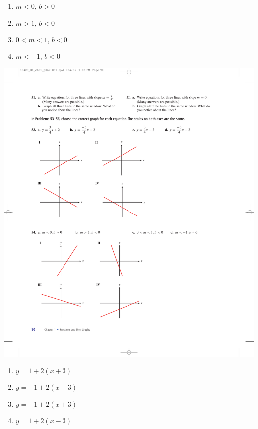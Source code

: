\documentclass[10pt,]{book}
\theoremstyle{plain}
\theoremstyle{definition}
\theoremstyle{definition}
\theoremstyle{definition}
\theoremstyle{definition}
\numberwithin{equation}{part}
\newcommand{\lt}{<}
\newcommand{\gt}{>}
\begin{document}
\begin{exerciselist}
\begin{exercisegroup}
\begin{multicols}{2}
\begin{enumerate}[label=*\alph**]
\item\hypertarget{li-1261}{}\(m\lt 0\), \(b\gt 0\)%
\item\hypertarget{li-1262}{}\(m\gt 1\), \(b\lt 0\)%
\item\hypertarget{li-1263}{}\(0\lt m\lt 1\), \(b\lt 0\)%
\item\hypertarget{li-1264}{}\(m\lt -1\), \(b\lt 0 \)%
\end{enumerate}
\end{multicols}
 \includegraphics[width=0.9\linewidth]{images/fig-ex-1-5-54}
%
\exercise[55.]\hypertarget{exercise-341}{}\leavevmode%
\begin{multicols}{2}
\begin{enumerate}[label=*\alph**]
\item\hypertarget{li-1265}{}\(y = 1 + 2(x+3) \)%
\item\hypertarget{li-1266}{}\(y = -1 + 2(x-3)\)%
\item\hypertarget{li-1267}{}\(y = -1 + 2(x+3) \)%
\item\hypertarget{li-1268}{}\(y = 1 + 2(x-3) \)%
\end{enumerate}
\end{multicols}

\end{exercisegroup}
\end{exerciselist}
\end{document}
